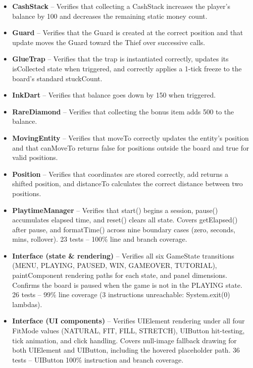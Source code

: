 \documentclass[12pt]{article}
\begin{document}
\begin{itemize}

\item \textbf{CashStack} -- Verifies that collecting a CashStack increases the player's balance by 100 and decreases the remaining static money count.

\item \textbf{Guard} -- Verifies that the Guard is created at the correct position and that update moves the Guard toward the Thief over successive calls.

\item \textbf{GlueTrap} -- Verifies that the trap is instantiated correctly, updates its isCollected state when triggered, and correctly applies a 1-tick freeze to the board's standard stuckCount.

\item \textbf{InkDart} -- Verifies that balance goes down by 150 when triggered.

\item \textbf{RareDiamond} -- Verifies that collecting the bonus item adds 500 to the balance.

\item \textbf{MovingEntity} -- Verifies that moveTo correctly updates the entity's position and that canMoveTo returns false for positions outside the board and true for valid positions.

\item \textbf{Position} -- Verifies that coordinates are stored correctly, add returns a shifted position, and distanceTo calculates the correct distance between two positions.

\item \textbf{PlaytimeManager} -- Verifies that start() begins a session, pause() accumulates elapsed time, and reset() clears all state. Covers getElapsed() after pause, and formatTime() across nine boundary cases (zero, seconds, mins, rollover). 23 tests -- 100\% line and branch coverage.

\item \textbf{Interface (state \& rendering)} -- Verifies all six GameState transitions (MENU, PLAYING, PAUSED, WIN, GAMEOVER, TUTORIAL), paintComponent rendering paths for each state, and panel dimensions. Confirms the board is paused when the game is not in the PLAYING state. 26 tests -- 99\% line coverage (3 instructions unreachable: System.exit(0) lambdas).

\item \textbf{Interface (UI components)} -- Verifies UIElement rendering under all four FitMode values (NATURAL, FIT, FILL, STRETCH), UIButton hit-testing, tick animation, and click handling. Covers null-image fallback drawing for both UIElement and UIButton, including the hovered placeholder path. 36 tests -- UIButton 100\% instruction and branch coverage.


\end{itemize}
\end{document}
